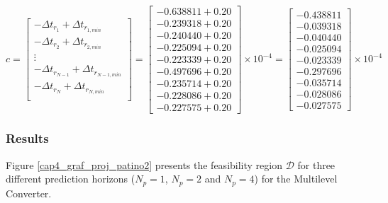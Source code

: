 \begin{equation}
    c = 
    \left[
        \begin{matrix}
            -\Delta t_{r_1} +\Delta t_{r_{1, min}} \\
            -\Delta t_{r_2} +\Delta t_{r_{2, min}} \\
            \vdots \\
            -\Delta t_{r_{N-1}} +\Delta t_{r_{{N-1}, min}} \\
            -\Delta t_{r_N} +\Delta t_{r_{N, min}} \\
        \end{matrix}
    \right] = 
    \left[
        \begin{matrix}
            -0.638811 + 0.20 \\
            -0.239318 + 0.20 \\
            -0.240440 + 0.20 \\
            -0.225094 + 0.20 \\
            -0.223339 + 0.20 \\
            -0.497696 + 0.20 \\
            -0.235714 + 0.20 \\
            -0.228086 + 0.20 \\
            -0.227575 + 0.20
        \end{matrix}
    \right] \times 10^{ -4  }=
    \left[
        \begin{matrix}
            -0.438811 \\
            -0.039318 \\
            -0.040440 \\
            -0.025094 \\
            -0.023339 \\
            -0.297696 \\
            -0.035714 \\
            -0.028086 \\
            -0.027575
        \end{matrix}
    \right] \times 10^{ -4 }
\end{equation}

\subsubsection{Results}


Figure \ref{cap4_graf_proj_patino2} presents the feasibility region $\mathcal{D}$ for three different prediction horizons 
($N_p = 1$, $N_p = 2$ and $N_p = 4$) for the Multilevel Converter.


